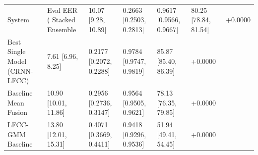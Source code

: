 \begin{tabular}{llllll}
\toprule
System & Eval EER (%
\midrule
Stacked Ensemble & 10.07 [9.28, 10.89] & 0.2663 [0.2503, 0.2813] & 0.9617 [0.9566, 0.9667] & 80.25 [78.84, 81.54] & +0.0000 \\
Best Single Model (CRNN-LFCC) & 7.61 [6.96, 8.25] & 0.2177 [0.2072, 0.2288] & 0.9784 [0.9747, 0.9819] & 85.87 [85.40, 86.39] & +0.0000 \\
Baseline Mean Fusion & 10.90 [10.01, 11.86] & 0.2956 [0.2736, 0.3147] & 0.9564 [0.9505, 0.9621] & 78.13 [76.35, 79.85] & +0.0000 \\
LFCC-GMM Baseline & 13.80 [12.01, 15.31] & 0.4071 [0.3669, 0.4411] & 0.9418 [0.9296, 0.9536] & 51.94 [49.41, 54.45] & +0.0000 \\
\bottomrule
\end{tabular}
